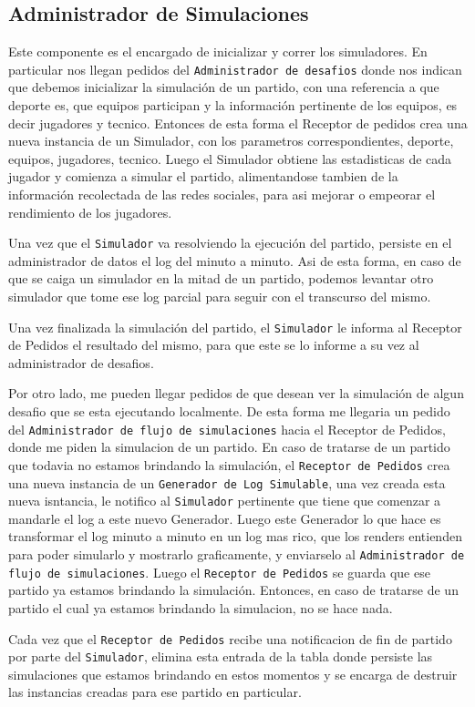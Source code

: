 \subsection{Administrador de Simulaciones}


Este componente es el encargado de inicializar y correr los simuladores. En particular nos llegan pedidos del \texttt{Administrador de desafios} donde nos indican que debemos inicializar la simulación de un partido, con una referencia a que deporte es, que equipos participan y la información pertinente de los equipos, es decir jugadores y tecnico. Entonces de esta forma el Receptor de pedidos crea una nueva instancia de un Simulador, con los parametros correspondientes, deporte, equipos, jugadores, tecnico. Luego el Simulador obtiene las estadisticas de cada jugador y comienza a simular el partido, alimentandose tambien de la información recolectada de las redes sociales, para asi mejorar o empeorar el rendimiento de los jugadores.

Una vez que el \texttt{Simulador} va resolviendo la ejecución del partido, persiste en el administrador de datos el log del minuto a minuto. Asi de esta forma, en caso de que se caiga un simulador en la mitad de un partido, podemos levantar otro simulador que tome ese log parcial para seguir con el transcurso del mismo.

Una vez finalizada la simulación del partido, el \texttt{Simulador} le informa al Receptor de Pedidos el resultado del mismo, para que este se lo informe a su vez al administrador de desafios.

Por otro lado, me pueden llegar pedidos de que desean ver la simulación de algun desafio que se esta ejecutando localmente. De esta forma me llegaria un pedido del \texttt{Administrador de flujo de simulaciones} hacia el Receptor de Pedidos, donde me piden la simulacion de un partido. En caso de tratarse de un partido que todavia no estamos brindando la simulación, el \texttt{Receptor de Pedidos} crea una nueva instancia de un \texttt{Generador de Log Simulable}, una vez creada esta nueva isntancia, le notifico al \texttt{Simulador} pertinente que tiene que comenzar a mandarle el log a este nuevo Generador. Luego este Generador lo que hace es transformar el log minuto a minuto en un log mas rico, que los renders entienden para poder simularlo y mostrarlo graficamente, y enviarselo al \texttt{Administrador de flujo de simulaciones}. Luego el \texttt{Receptor de Pedidos} se guarda que ese partido ya  estamos brindando la simulación. Entonces, en caso de tratarse de un partido el cual ya estamos brindando la simulacion, no se hace nada.

Cada vez que el \texttt{Receptor de Pedidos} recibe una notificacion de fin de partido por parte del \texttt{Simulador}, elimina esta entrada de la tabla donde persiste las simulaciones que estamos brindando en estos momentos y se encarga de destruir las instancias creadas para ese partido en particular.

